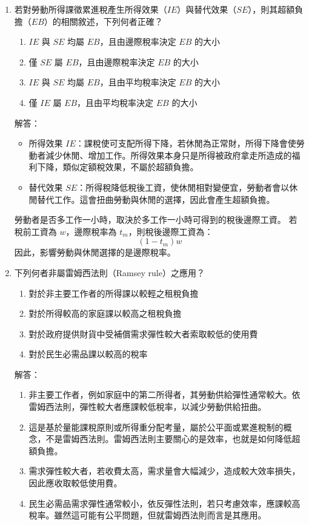 \documentclass[12pt, a4paper]{article}
\begin{document}
\begin{enumerate}
    \item 若對勞動所得課徵累進稅產生所得效果（\(IE\)）與替代效果（\(SE\)），則其超額負擔（\(EB\)）的相關敘述，下列何者正確？
    \begin{enumerate}[label=\Alph*.]
        \item \(IE\) 與 \(SE\) 均屬 \(EB\)，且由邊際稅率決定 \(EB\) 的大小
        \item 僅 \(SE\) 屬 \(EB\)，且由邊際稅率決定 \(EB\) 的大小
        \item \(IE\) 與 \(SE\) 均屬 \(EB\)，且由平均稅率決定 \(EB\) 的大小
        \item 僅 \(IE\) 屬 \(EB\)，且由平均稅率決定 \(EB\) 的大小
    \end{enumerate}
    解答：
    \begin{itemize}
        \item 所得效果 \(IE\)：課稅使可支配所得下降，若休閒為正常財，所得下降會使勞動者減少休閒、增加工作。所得效果本身只是所得被政府拿走所造成的福利下降，類似定額稅效果，不屬於超額負擔。
        \item 替代效果 \(SE\)：所得稅降低稅後工資，使休閒相對變便宜，勞動者會以休閒替代工作。這會扭曲勞動與休閒的選擇，因此會產生超額負擔。
    \end{itemize}
    勞動者是否多工作一小時，取決於多工作一小時可得到的稅後邊際工資。
    若稅前工資為 \(w\)，邊際稅率為 \(t_m\)，則稅後邊際工資為：
    \[
    (1-t_m)w
    \]
    因此，影響勞動與休閒選擇的是邊際稅率。

    \item 下列何者非屬雷姆西法則（Ramsey rule）之應用？
    \begin{enumerate}[label=\Alph*.]
        \item 對於非主要工作者的所得課以較輕之租稅負擔
        \item 對於所得較高的家庭課以較高之租稅負擔
        \item 對於政府提供財貨中受補償需求彈性較大者索取較低的使用費
        \item 對於民生必需品課以較高的稅率
    \end{enumerate}
    解答：
    \begin{enumerate}[label=\Alph*.]
        \item 非主要工作者，例如家庭中的第二所得者，其勞動供給彈性通常較大。依雷姆西法則，彈性較大者應課較低稅率，以減少勞動供給扭曲。
        \item 這是基於量能課稅原則或所得重分配考量，屬於公平面或累進稅制的概念，不是雷姆西法則。雷姆西法則主要關心的是效率，也就是如何降低超額負擔。
        \item 需求彈性較大者，若收費太高，需求量會大幅減少，造成較大效率損失，因此應收取較低使用費。
        \item 民生必需品需求彈性通常較小，依反彈性法則，若只考慮效率，應課較高稅率。雖然這可能有公平問題，但就雷姆西法則而言是其應用。
    \end{enumerate}


\end{enumerate}
\end{document}

